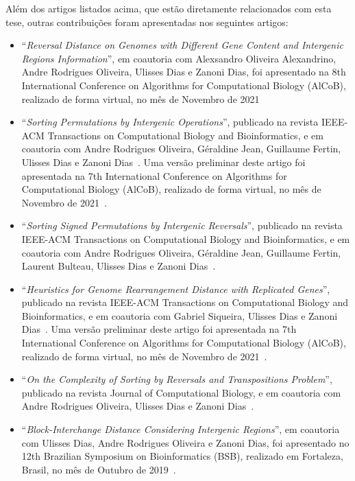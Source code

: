 Além dos artigos listados acima, que estão diretamente relacionados com esta tese, outras contribuições foram apresentadas nos seguintes artigos:

\begin{itemize}
  \item ``\textit{Reversal Distance on Genomes with Different Gene Content and Intergenic Regions Information}'', em coautoria com Alexsandro Oliveira Alexandrino, Andre Rodrigues Oliveira, Ulisses Dias e Zanoni Dias, foi apresentado na 8th International Conference on Algorithms for Computational Biology (AlCoB), realizado de forma virtual, no mês de Novembro de 2021~\cite{2021b-alexandrino-etal}

  \item ``\textit{Sorting Permutations by Intergenic Operations}'', publicado na revista IEEE-ACM Transactions on Computational Biology and Bioinformatics, e em coautoria com Andre Rodrigues Oliveira, Géraldine Jean, Guillaume Fertin, Ulisses Dias e Zanoni Dias~\cite{2021a-oliveira-etal}. Uma versão preliminar deste artigo foi apresentada na 7th International Conference on Algorithms for Computational Biology (AlCoB), realizado de forma virtual, no mês de Novembro de 2021~\cite{2020-oliveira-etal}.

  \item ``\textit{Sorting Signed Permutations by Intergenic Reversals}'', publicado na revista IEEE-ACM Transactions on Computational Biology and Bioinformatics, e em coautoria com Andre Rodrigues Oliveira, Géraldine Jean, Guillaume Fertin, Laurent Bulteau, Ulisses Dias e Zanoni Dias~\cite{2021b-oliveira-etal}.

  \item ``\textit{Heuristics for Genome Rearrangement Distance with Replicated Genes}'', publicado na revista IEEE-ACM Transactions on Computational Biology and Bioinformatics, e em coautoria com Gabriel Siqueira, Ulisses Dias e Zanoni Dias~\cite{2021a-siqueira-etal}. Uma versão preliminar deste artigo foi apresentada na 7th International Conference on Algorithms for Computational Biology (AlCoB), realizado de forma virtual, no mês de Novembro de 2021~\cite{2020-siqueira-etal}.

  \item ``\textit{On the Complexity of Sorting by Reversals and Transpositions Problem}'', publicado na revista Journal of Computational Biology, e em coautoria com Andre Rodrigues Oliveira, Ulisses Dias e Zanoni Dias~\cite{2019b-oliveira-etal}.

  \item ``\textit{Block-Interchange Distance Considering Intergenic Regions}'', em coautoria com Ulisses Dias, Andre Rodrigues Oliveira e Zanoni Dias, foi apresentado no 12th Brazilian Symposium on Bioinformatics (BSB), realizado em Fortaleza, Brasil, no mês de Outubro de 2019~\cite{2019-dias-etal}.
\end{itemize}

